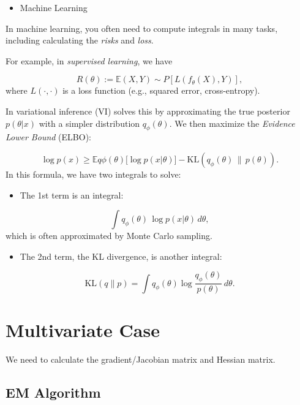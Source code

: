 \documentclass[
  letterpaper,
  DIV=11,
  numbers=noendperiod]{scrreprt}
\providecommand{\tightlist}{%
  \setlength{\itemsep}{0pt}\setlength{\parskip}{0pt}}
\begin{document}
{\begin{itemize}
\tightlist
\item
  Machine Learning
\end{itemize}

In machine learning, you often need to compute integrals in many tasks,
including calculating the \emph{risks} and \emph{loss}.

For example, in \emph{supervised learning}, we have

\[R(\theta) := \mathbb E{(X,Y) \sim P}[L(f_\theta(X), Y)],
\] where \(L(\cdot,\cdot)\) is a loss function (e.g., squared error,
cross-entropy).

In variational inference (VI) solves this by approximating the true
posterior \(p(\theta|x)\) with a simpler distribution
\(q_\phi(\theta)\). We then maximize the \emph{Evidence Lower Bound}
(ELBO):

\[
\log p(x) \geq \mathbb{E}{q\phi(\theta)}\big[\log p(x|\theta)\big] - \text{KL}(q_\phi(\theta)\,\|\,p(\theta)).
\] In this formula, we have two integrals to solve:

\begin{itemize}
\tightlist
\item
  The 1st term is an integral:
\end{itemize}

\[\int q_\phi(\theta)\,\log p(x|\theta)\, d\theta,\] which is often
approximated by Monte Carlo sampling.

\begin{itemize}
\tightlist
\item
  The 2nd term, the KL divergence, is another integral:
\end{itemize}

\[\text{KL}(q \| p) = \int q_\phi(\theta) \log \frac{q_\phi(\theta)}{p(\theta)} \, d\theta.\]

\section{}\label{section}

\section{Multivariate Case}\label{multivariate-case}

We need to calculate the gradient/Jacobian matrix and Hessian matrix.

\subsection{EM Algorithm}\label{em-algorithm}

}
\end{document}

